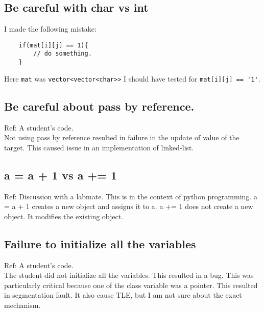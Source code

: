 \subsection{Be careful with char vs int}
I made the following mistake:\\
\begin{verbatim}
	if(mat[i][j] == 1){
		// do something.
	}
\end{verbatim}
Here \verb!mat! was \verb!vector<vector<char>>! I should have tested for \verb!mat[i][j] == '1'!.

\subsection{Be careful about pass by reference.}
Ref: A student's code. \\
Not using pass by reference  resulted in failure in the update of value of the target.
This caused issue in an implementation of linked-list.

\subsection{a = a + 1 vs a += 1}
Ref: Discussion with a labmate.
This is in the context of python programming.
a = a + 1 creates a new object and assigns it to a.
a += 1 does not create a new object. It modifies the existing object.

\subsection{Failure to initialize all the variables}
Ref: A student's code.\\
The student did not initialize all the variables. This resulted in a bug.
This was particularly critical because one  of the class variable was a pointer.
This resulted in segmentation fault. It also cause TLE, but I am not sure about the exact mechanism.

\vfill \null
\columnbreak

